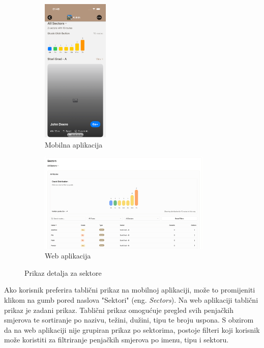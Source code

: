 \begin{figure}[H]
    \centering
    \begin{subfigure}[b]{\textwidth}
        \centering
        \includegraphics[width=0.35\textwidth]{images/implementacija/crag-details/crag-all-sectors-tabs.png}
        \caption{Mobilna aplikacija}
        \label{fig:prikaz_detalja_za_sektore_mob}
    \end{subfigure}
    \hfill
    \begin{subfigure}[b]{\textwidth}
        \centering
        \includegraphics[width=0.9\textwidth]{images/implementacija/web/crag-details/crag-all-sectors.png}
        \caption{Web aplikacija}
        \label{fig:prikaz_detalja_za_sektore_web}
    \end{subfigure}
    \caption{Prikaz detalja za sektore}
    \label{fig:prikaz_detalja_za_sektore}
\end{figure}

Ako korisnik preferira tablični prikaz na mobilnoj aplikaciji, može to promijeniti klikom na gumb pored naslova "Sektori" (eng. \textit{Sectors}). Na web aplikaciji tablični prikaz je zadani prikaz. Tablični prikaz omogućuje pregled svih penjačkih smjerova te sortiranje po nazivu, težini, dužini, tipu te broju uspona. S obzirom da na web aplikaciji nije grupiran prikaz po sektorima, postoje filteri koji korisnik može koristiti za filtriranje penjačkih smjerova po imenu, tipu i sektoru.

